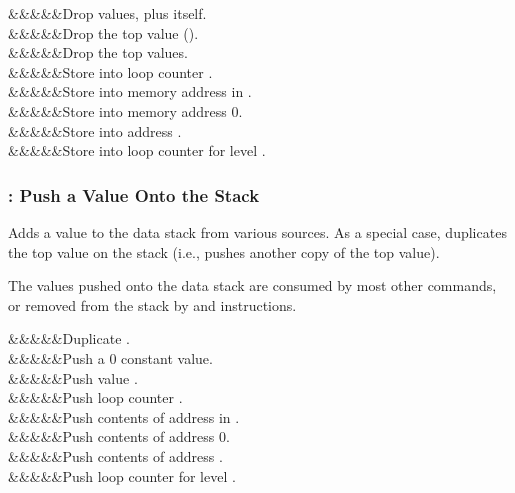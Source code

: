 \documentclass[letterpaper,twoside,onecolumn,openright,final]{memoir}
\begin{document}
{\begin{opdesc}
  &&&&\z{\$}&Drop  values, plus  itself.\\
  &&&&&Drop the top value ().\\
  &&&&\z{\#}&Drop the top  values.\\
  &&&&&Store  into loop counter .\\
  &&&&\z{[\$]}&Store  into memory address in .\\
  &&&&\z{[0]}&Store  into memory address 0.\\
  &&&&\z{[}\z{]}&Store  into address .\\
  &&&&\z{\{\$\}}&Store  into loop counter for level .\\
\end{opdesc}

\subsubsection{: Push a Value Onto the Stack}
Adds a value to the data stack from various sources.  As a special case,  duplicates
the top value on the stack (i.e., pushes another copy of the top value).

The values pushed onto the data stack are consumed by most other commands, or removed from
the stack by  and  instructions.

\begin{opdesc}
  &&&&&Duplicate .\\
  &&&&&Push a 0 constant value.\\
  &&&&\z{\#}&Push value .\\
  &&&&&Push loop counter .\\
  &&&&\z{[\$]}&Push contents of address in .\\
  &&&&\z{[0]}&Push contents of address 0.\\
  &&&&\z{[}\z{]}&Push contents of address .\\
  &&&&\z{\{\$\}}&Push loop counter for level .\\
\end{opdesc}

}
\end{document}
